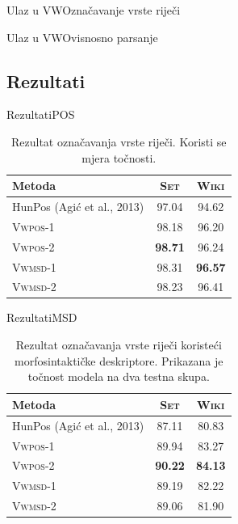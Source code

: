 \documentclass{beamer}
\begin{document}
\begin{frame}{Ulaz u VW}{Označavanje vrste riječi}
  \lstV
\end{frame}

\begin{frame}{Ulaz u VW}{Ovisnosno parsanje}
  \lstD
\end{frame}

\subsection{Rezultati}

\begin{frame}{Rezultati}{POS}
  \begin{table}
  \centering
  \caption[Rezultat označavanja vrste riječi.]{Rezultat označavanja vrste riječi.
  Koristi se mjera točnosti.}
  \label{table:postagging}
  \begin{tabular}{|l|c|c|}
  \hline
  Metoda                               & \textsc{Set}   & \textsc{Wiki}  \\ \hline \hline
  HunPos (Agić et al., 2013)           & 97.04          & 94.62          \\
  \textsc{Vwpos-1}                     & 98.18          & 96.20          \\
  \textsc{Vwpos-2}                     & \textbf{98.71} & 96.24          \\
  \textsc{Vwmsd-1}                     & 98.31          & \textbf{96.57} \\
  \textsc{Vwmsd-2}                     & 98.23          & 96.41          \\ \hline
  \end{tabular}
  \end{table}
\end{frame}

\begin{frame}{Rezultati}{MSD}
  \begin{table}
  \centering
  \caption[Rezultat označavanja vrste riječi koristeći morfosintaktičke
  deskriptore.]{Rezultat označavanja vrste riječi koristeći morfosintaktičke
  deskriptore. Prikazana je točnost modela na dva testna skupa.}
  \label{table:msdtagging}
  \begin{tabular}{|l|c|c|}
  \hline
  Metoda                               & \textsc{Set}   & \textsc{Wiki}  \\ \hline \hline
  HunPos (Agić et al., 2013)           & 87.11          & 80.83          \\
  \textsc{Vwpos-1}                     & 89.94          & 83.27          \\
  \textsc{Vwpos-2}                     & \textbf{90.22} & \textbf{84.13} \\
  \textsc{Vwmsd-1}                     & 89.19          & 82.22          \\
  \textsc{Vwmsd-2}                     & 89.06          & 81.90          \\ \hline
  \end{tabular}
  \end{table}
\end{frame}
\end{document}
